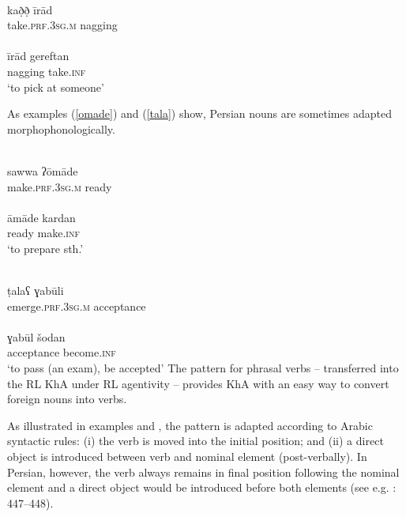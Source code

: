 \documentclass[output=paper,nonflat]{langsci/langscibook}
\begin{document}
\ea \label{irad}
\\
\gll kað̣ð̣ īrād\\
     take.\textsc{prf}.3\textsc{sg}.\textsc{m} nagging\\ 
\\
\gll īrād gereftan\\
     nagging take.\textsc{inf}\\
\glt ‘to pick at someone’ 
\z\z

 As examples (\ref{omade}) and (\ref{tala}) show, Persian nouns are sometimes adapted morphophonologically.

\ea \label{omade}
\\
\gll sawwa ʔōmāde\\
     make.\textsc{prf}.3\textsc{sg}.\textsc{m} ready\\ 
\\
\gll āmāde kardan \\
     ready make.\textsc{inf}\\
\glt ‘to prepare sth.’
\z\z

\ea \label{tala}
\\
\gll ṭalaʕ ɣabūli\footnotemark \\
     emerge.\textsc{prf}.3\textsc{sg}.\textsc{m} acceptance\\
\\
\gll ɣabūl šodan\\
     acceptance become.\textsc{inf} \\
\glt ‘to pass (an exam), be accepted’
\z\z
{}
The pattern for phrasal verbs – transferred into the RL KhA under RL agentivity – provides KhA with an easy way to convert foreign nouns into verbs.

As illustrated in examples  and , the pattern is adapted according to Arabic syntactic rules: (i) the verb is moved into the initial position; and (ii) a direct object is introduced between verb and nominal element (post-verbally). In Persian, however, the verb always remains in final position following the nominal element and a direct object would be introduced before both elements (see e.g. \citealt{Majidi1990}: 447–448).
\end{document}

